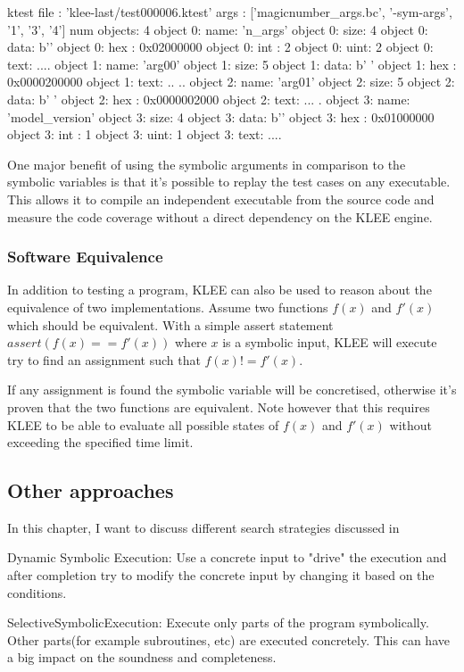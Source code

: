 \begin{codesnippet}[caption={The test case generated by KLEE which triggers the assertion error when executing it on the code-snippet \ref{codeSnippet:klee_arguments}}, label={codeSnippet:test_case_two}]
ktest file : 'klee-last/test000006.ktest'
args       : ['magicnumber_args.bc',
              '-sym-args', '1', '3', '4']
num objects: 4
object 0: name: 'n_args'
object 0: size: 4
object 0: data: b''
object 0: hex : 0x02000000
object 0: int : 2
object 0: uint: 2
object 0: text: ....
object 1: name: 'arg00'
object 1: size: 5
object 1: data: b' '
object 1: hex : 0x0000200000
object 1: text: .. ..
object 2: name: 'arg01'
object 2: size: 5
object 2: data: b' '
object 2: hex : 0x0000002000
object 2: text: ... .
object 3: name: 'model_version'
object 3: size: 4
object 3: data: b''
object 3: hex : 0x01000000
object 3: int : 1
object 3: uint: 1
object 3: text: ....
\end{codesnippet}

One major benefit of using the symbolic arguments in comparison to the symbolic variables is that it's possible to replay the test cases on any executable.
This allows it to compile an independent executable from the source code and measure the code coverage without a direct dependency on the KLEE engine.

\subsubsection{Software Equivalence}\label{section:software_equivalence}
In addition to testing a program, KLEE can also be used to reason about the equivalence of two implementations. Assume two functions $f(x)$ and $f'(x)$ which should be equivalent. With a simple assert statement $assert(f(x) == f'(x))$ where $x$ is a symbolic input, KLEE will execute try to find an assignment such that $f(x) != f'(x)$.

If any assignment is found the symbolic variable will be concretised, otherwise it's proven that the two functions are equivalent. Note however that this requires KLEE to be able to evaluate all possible states of $f(x)$ and $f'(x)$ without exceeding the specified time limit.
\subsection{Other approaches}
In this chapter, I want to discuss different search strategies discussed in \cite{SurveySymExec-CSUR18}

Dynamic Symbolic Execution: Use a concrete input to "drive" the execution and after completion try to modify the concrete input by changing it based on the conditions. \cite{Godefroid:2005:DDA:1064978.1065036}

SelectiveSymbolicExecution: Execute only parts of the program symbolically. Other parts(for example subroutines, etc) are executed concretely. This can have a big impact on the soundness and completeness. \cite{Chipounov:2012:SPD:2110356.2110358}
